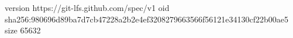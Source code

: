 version https://git-lfs.github.com/spec/v1
oid sha256:980696d89ba7d7cb47228a2b2e4ef3208279663566f56121e34130cf22b00ae5
size 65632

